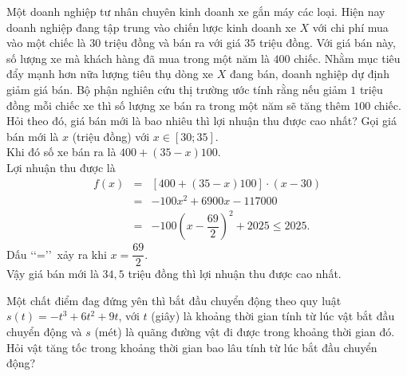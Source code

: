 \begin{bt}%
Một doanh nghiệp tư nhân chuyên kinh doanh xe gắn máy các loại. Hiện nay doanh nghiệp đang tập trung vào chiến lược kinh doanh xe $X$ với chi phí mua vào một chiếc là $30$ triệu đồng và bán ra với giá $35$ triệu đồng. Với giá bán này, số lượng xe mà khách hàng đã mua trong một năm là $400$ chiếc. Nhằm mục tiêu đẩy mạnh hơn nữa lượng tiêu thụ dòng xe $X$ đang bán, doanh nghiệp dự định giảm giá bán. Bộ phận nghiên cứu thị trường ước tính rằng nếu giảm $1$ triệu đồng mỗi chiếc xe thì số lượng xe bán ra trong một năm sẽ tăng thêm $100$ chiếc. Hỏi theo đó, giá bán mới là bao nhiêu thì lợi nhuận thu được cao nhất?
\loigiai
{
	Gọi giá bán mới là $x$ (triệu đồng) với $x\in [30;35]$.\\
	Khi đó số xe bán ra là $400+(35-x)100$.\\
	Lợi nhuận thu được là \begin{eqnarray*}
	f(x)&=&[400+(35-x)100] \cdot(x-30)\\
	&=&-100x^2+6900x-117000 \\
	&=&-100\left(x-\dfrac{69}{2}\right)^2+2025 \leq 2025.
	\end{eqnarray*}
	Dấu \lq \lq=\rq \rq~xảy ra khi $x=\dfrac{69}{2}$.\\
	Vậy giá bán mới là $34{,}5$ triệu đồng thì lợi nhuận thu được cao nhất.
}
\end{bt}

\begin{bt}%
	Một chất điểm đag đứng yên thì bắt đầu chuyển động theo quy luật $s(t)=-t^3+6t^2+9t$, với $t$ (giây) là khoảng thời gian tính từ lúc vật bắt đầu chuyển động và $s$ (mét) là quãng đường vật đi được trong khoảng thời gian đó. Hỏi vật tăng tốc trong khoảng thời gian bao lâu tính từ lúc bắt đầu chuyển động?
\end{bt}

